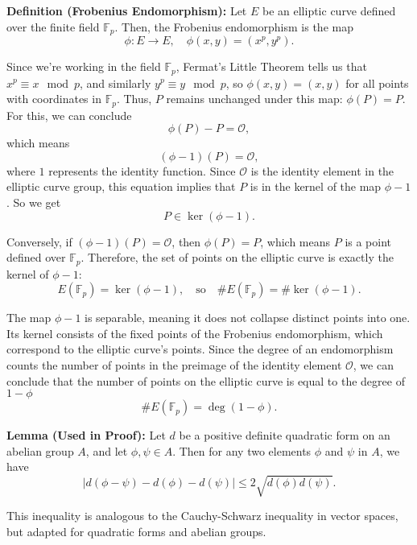 \documentclass[11pt]{article}
\begin{document}
\vspace{0.3cm}

\textbf{Definition (Frobenius Endomorphism):}  
Let \(E\) be an elliptic curve defined over the finite field \(\mathbb{F}_p\). Then, the Frobenius endomorphism is the map 
\[\phi: E \rightarrow E,\quad \phi(x, y) = (x^p, y^p).\]

Since we're working in the field \(\mathbb{F}_p\), Fermat's Little Theorem tells us that \(x^p \equiv x \mod p\), and similarly \(y^p \equiv y \mod p\), so \(\phi(x, y) = (x, y)\) for all points with coordinates in \(\mathbb{F}_p\). Thus, \(P\) remains unchanged under this map: \(\phi(P) = P\).  
For this, we can conclude
\[\phi(P) - P = \mathcal{O},\]
which means
\[(\phi - 1)(P) = \mathcal{O},\]
where \(1\) represents the identity function.  
Since \(\mathcal{O}\) is the identity element in the elliptic curve group, this equation implies that \(P\) is in the kernel of the map \(\phi - 1\). So we get
\[P \in \ker(\phi - 1).\]

Conversely, if \((\phi - 1)(P) = \mathcal{O}\), then \(\phi(P) = P\), which means \(P\) is a point defined over \(\mathbb{F}_p\).  
Therefore, the set of points on the elliptic curve is exactly the kernel of \(\phi - 1\):
\[E(\mathbb{F}_p) = \ker(\phi - 1), \quad \text{so} \quad \#E(\mathbb{F}_p) = \#\ker(\phi - 1).\]

The map \(\phi - 1\) is separable, meaning it does not collapse distinct points into one. Its kernel consists of the fixed points of the Frobenius endomorphism, which correspond to the elliptic curve's points. Since the degree of an endomorphism counts the number of points in the preimage of the identity element \(\mathcal{O}\), we can conclude that the number of points on the elliptic curve is equal to the degree of \(1 - \phi\)
\[\#E(\mathbb{F}_p) = \deg(1 - \phi).\]

\vspace{0.3cm}

\textbf{Lemma (Used in Proof):} Let \( d \) be a positive definite quadratic form on an abelian group \( A \), and let \( \phi, \psi \in A \). Then for any two elements \( \phi \) and \( \psi \) in \( A \), we have 
\[ |d(\phi - \psi) - d(\phi) - d(\psi)| \leq 2 \sqrt{d(\phi) d(\psi)}.\]

This inequality is analogous to the Cauchy-Schwarz inequality in vector spaces, but adapted for quadratic forms and abelian groups.

\vspace{0.3cm}
\end{document}
